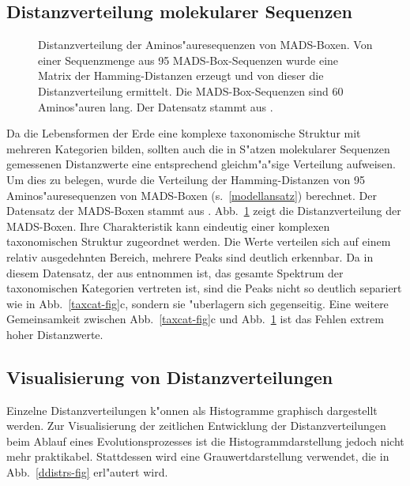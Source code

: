 \subsection{Distanzverteilung molekularer Sequenzen}

\begin{figure}
\centerline{\epsfxsize=8cm }
\caption[Distanzverteilung der Aminos"auresequenzen von MADS-Boxen]
{\label{mads-ddistr}
Distanzverteilung der Aminos"auresequenzen von MADS-Boxen. Von einer Sequenzmenge aus 95  MADS-Box-Sequenzen
wurde eine Matrix der Hamming-Distanzen erzeugt und von dieser die Distanzverteilung ermittelt. Die MADS-Box-Sequenzen
sind 60 Aminos"auren lang. Der Datensatz stammt aus \protect\cite{Theissen95a}.
}
\end{figure}

Da die Lebensformen der Erde eine komplexe taxonomische Struktur mit mehreren Kategorien bilden, sollten
auch die in S"atzen molekularer Sequenzen gemessenen Distanzwerte eine entsprechend gleichm"a"sige Verteilung
aufweisen. Um dies zu belegen, wurde die Verteilung der Hamming-Distanzen von 95 Aminos"auresequenzen
von MADS-Boxen (s.\ \ref{modellansatz}) berechnet. Der Datensatz der MADS-Boxen stammt aus \cite{Theissen95a}.
Abb.\ \ref{mads-ddistr} zeigt die Distanzverteilung der MADS-Boxen. Ihre Charakteristik kann
eindeutig einer komplexen taxonomischen Struktur zugeordnet werden. Die Werte verteilen sich auf einem relativ
ausgedehnten Bereich, mehrere Peaks sind deutlich erkennbar. Da in diesem Datensatz, der aus \cite{Theissen95a}
entnommen ist, das gesamte Spektrum der taxonomischen Kategorien vertreten ist, sind die Peaks nicht so deutlich
separiert wie in Abb.\ \ref{taxcat-fig}c, sondern sie "uberlagern sich gegenseitig. Eine weitere Gemeinsamkeit
zwischen Abb.\ \ref{taxcat-fig}c und Abb.\ \ref{mads-ddistr} ist das Fehlen extrem hoher Distanzwerte.



\subsection{Visualisierung von Distanzverteilungen}

Einzelne Distanzverteilungen k"onnen als Histogramme graphisch dargestellt
werden. Zur Visualisierung der zeitlichen Entwicklung der Distanzverteilungen
beim Ablauf eines Evolutionsprozesses ist die Histogrammdarstellung jedoch
nicht mehr praktikabel. Stattdessen wird eine Grauwertdarstellung verwendet,
die in Abb.\ \ref{ddistrs-fig} erl"autert wird.

